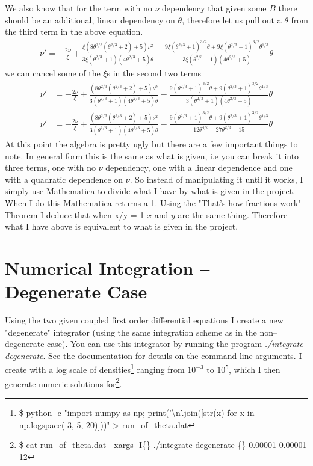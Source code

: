 We also know that for the term with no $\nu$ dependency that given some $B$ there should be an additional, linear dependency on $\theta$, therefore let us pull out a $\theta$ from the third term in the above equation.
\begin{align*}
	\nu' = -\frac{2\nu}{\xi} + \frac{\xi\left(8 \theta^{2/3} \left(\theta^{2/3}+2\right)+5\right) \nu^2}{3 \xi  \left(\theta^{2/3}+1\right) \left(4 \theta^{2/3}+5\right) \theta} - \frac{9 \xi  \left(\theta^{2/3}+1\right)^{3/2} \theta+9 \xi  \left(\theta^{2/3}+1\right)^{3/2} \theta^{1/3}}{3 \xi  \left(\theta^{2/3}+1\right) \left(4 \theta^{2/3}+5\right)}\theta
\end{align*}
we can cancel some of the $\xi$s in the second two terms
\begin{align*}
	\nu' &= -\frac{2\nu}{\xi} + \frac{\left(8 \theta^{2/3} \left(\theta^{2/3}+2\right)+5\right) \nu^2}{3\left(\theta^{2/3}+1\right) \left(4 \theta^{2/3}+5\right) \theta} - \frac{9  \left(\theta^{2/3}+1\right)^{3/2} \theta+9  \left(\theta^{2/3}+1\right)^{3/2} \theta^{1/3}}{3  \left(\theta^{2/3}+1\right) \left(4 \theta^{2/3}+5\right)}\theta \\
	\nu' &= -\frac{2\nu}{\xi} + \frac{\left(8 \theta^{2/3} \left(\theta^{2/3}+2\right)+5\right) \nu^2}{3\left(\theta^{2/3}+1\right) \left(4 \theta^{2/3}+5\right) \theta} - \frac{9  \left(\theta^{2/3}+1\right)^{3/2} \theta+9  \left(\theta^{2/3}+1\right)^{3/2} \theta^{1/3}}{12\theta^{4/3}+27\theta^{2/3}+15}\theta
\end{align*}
At this point the algebra is pretty ugly but there are a few important things to note. In general form this is the same as what is given, i.e you can break it into three terms, one with no $\nu$ dependency, one with a linear dependence and one with a quadratic dependence on $\nu$. So instead of manipulating it until it works, I simply use Mathematica to divide what I have by what is given in the project. When I do this Mathematica returns a 1. Using the "That's how fractions work" Theorem I deduce that when x/y = 1 $x$ and $y$ are the same thing. Therefore what I have above is equivalent to what is given in the project.

\section{Numerical Integration -- Degenerate Case}
Using the two given coupled first order differential equations I create a new "degenerate" integrator (using the same integration scheme as in the non--degenerate case). You can use this integrator by running the program \textit{./integrate-degenerate}. See the documentation for details on the command line arguments. I create with a log scale of densities\footnote{\scriptsize \$ python -c "import numpy as np; print('\textbackslash n'.join([str(x) for x in np.logspace(-3, 5, 20)]))" > run\_of\_theta.dat} ranging from $10^{-3}$ to $10^{5}$, which I then generate numeric solutions for\footnote{\$ cat run\_of\_theta.dat | xargs -I\{\} ./integrate-degenerate \{\} 0.00001 0.00001 12}.

